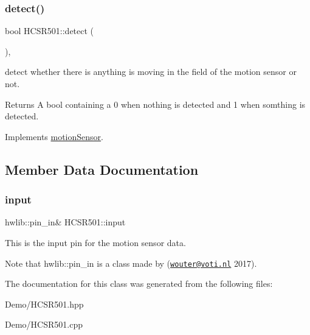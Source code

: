 \subsubsection{\texorpdfstring{detect()}{detect()}}
{\footnotesize\ttfamily bool H\+C\+S\+R501\+::detect (\begin{DoxyParamCaption}{ }\end{DoxyParamCaption})\hspace{0.3cm}{\ttfamily [override]}, {\ttfamily [virtual]}}

detect whether there is anything is moving in the field of the motion sensor or not. \begin{DoxyReturn}{Returns}
A bool containing a 0 when nothing is detected and 1 when somthing is detected. 
\end{DoxyReturn}


Implements \mbox{\hyperlink{classmotion_sensor_a0b8701a41516d8b1140c39474b1db9db}{motion\+Sensor}}.



\subsection{Member Data Documentation}
\mbox{\label{class_h_c_s_r501_a00d41bcf68fa634e07ae68488d2b61ee}} 
\subsubsection{\texorpdfstring{input}{input}}
{\footnotesize\ttfamily hwlib\+::pin\+\_\+in\& H\+C\+S\+R501\+::input\hspace{0.3cm}{\ttfamily [private]}}



This is the input pin for the motion sensor data. 

Note that hwlib\+::pin\+\_\+in is a class made by (\href{mailto:wouter@voti.nl}{\tt wouter@voti.\+nl} 2017). 

The documentation for this class was generated from the following files\+:\begin{DoxyCompactItemize}
\item 
Demo/H\+C\+S\+R501.\+hpp\item 
Demo/H\+C\+S\+R501.\+cpp\end{DoxyCompactItemize}
